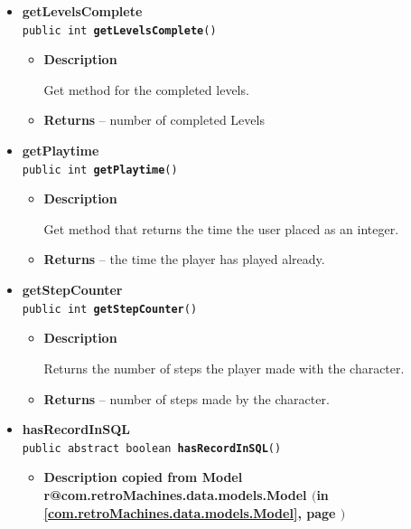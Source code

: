 \documentclass[11pt,a4paper]{report}
\makeatletter
\newcommand{\refdefined}[1]{
\expandafter\ifx\csname r@#1\endcsname\relax
\relax\else
{$($in \ref{#1}, page \pageref{#1}$)$}\fi}
\makeatother
\begin{document}
{{{{{{{\begin{itemize}
{\begin{itemize}
{This method attempts to retrieve a copy of the model from the persistent background storage and saves it to this object.
}
\end{itemize}
}%
\item{ 
{\bf  getLevelsComplete}\\
\texttt{public int\ {\bf  getLevelsComplete}()
\label{com.retroMachines.data.models.Statistic.getLevelsComplete()}}%
\begin{itemize}
\item{
{\bf  Description}

Get method for the completed levels.
}
\item{{\bf  Returns} -- 
number of completed Levels 
}%
\end{itemize}
}%
\item{ 
{\bf  getPlaytime}\\
\texttt{public int\ {\bf  getPlaytime}()
\label{com.retroMachines.data.models.Statistic.getPlaytime()}}%
\begin{itemize}
\item{
{\bf  Description}

Get method that returns the time the user placed as an integer.
}
\item{{\bf  Returns} -- 
the time the player has played already. 
}%
\end{itemize}
}%
\item{ 
{\bf  getStepCounter}\\
\texttt{public int\ {\bf  getStepCounter}()
\label{com.retroMachines.data.models.Statistic.getStepCounter()}}%
\begin{itemize}
\item{
{\bf  Description}

Returns the number of steps the player made with the character.
}
\item{{\bf  Returns} -- 
number of steps made by the character. 
}%
\end{itemize}
}%
\item{ 
{\bf  hasRecordInSQL}\\
\texttt{public abstract boolean\ {\bf  hasRecordInSQL}()
\label{com.retroMachines.data.models.Statistic.hasRecordInSQL()}}%
\begin{itemize}
\item{
{\bf  Description copied from Model{\small \refdefined{com.retroMachines.data.models.Model}} }

}
\end{itemize}}
\end{itemize}}}}}}}}
\end{document}

